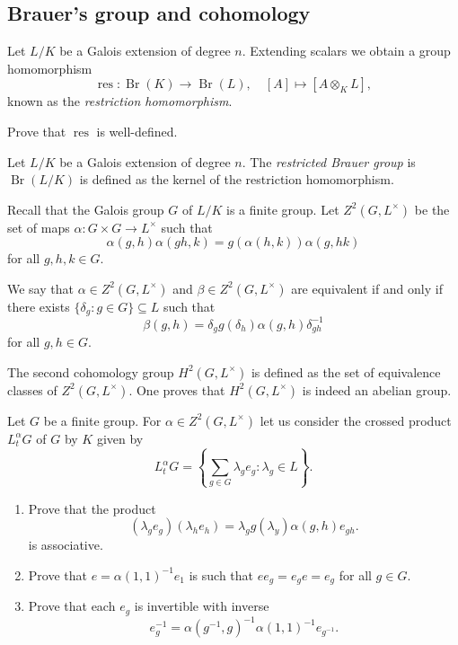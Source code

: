 \subsection{Brauer's group and cohomology}

Let $L/K$ be a Galois extension of degree $n$.  
Extending scalars we obtain a group homomorphism
\[
    \operatorname{res}\colon\operatorname{Br}(K)\to\operatorname{Br}(L),\quad
    [A]\mapsto [A\otimes_KL],
\]
known as the \emph{restriction homomorphism}. 

\begin{exercise}
    Prove that $\operatorname{res}$ is well-defined.
\end{exercise}

\begin{definition}
    Let $L/K$ be a Galois extension of degree $n$. 
    The \emph{restricted Brauer group} is $\operatorname{Br}(L/K)$ is defined
    as the kernel of the restriction homomorphism. 
\end{definition}


Recall that the Galois group $G$ of $L/K$ is a finite group. Let 
$Z^2(G,L^{\times})$ be the set of maps $\alpha\colon G\times G\to L^{\times}$
such that 
\[
\alpha(g,h)\alpha(gh,k)=g(\alpha(h,k))\alpha(g,hk)
\]
for all $g,h,k\in G$. 

We say that 
$\alpha\in Z^2(G,L^{\times})$ and $\beta\in Z^2(G,L^{\times})$ 
are equivalent if and only if
there exists $\{\delta_g:g\in G\}\subseteq L$ such that 
\[
\beta(g,h)=\delta_gg(\delta_h)\alpha(g,h)\delta^{-1}_{gh}
\]
for all $g,h\in G$. 

The second cohomology group $H^2(G,L^{\times})$ is defined as the
set of equivalence classes of $Z^2(G,L^{\times})$. One proves that
$H^2(G,L^{\times})$ is indeed an abelian group. 

\begin{exercise}
Let $G$ be a finite group. 
For $\alpha\in Z^2(G,L^{\times})$ let us consider the 
crossed product $L_t^{\alpha}G$ of $G$ by $K$ 
given by 
\[
L_t^{\alpha}G=\left\{\sum_{g\in G}\lambda_ge_g:\lambda_g\in L\right\}.
\]
\begin{enumerate}
    \item Prove that the product 
\[
    (\lambda_ge_g)(\lambda_he_h)=\lambda_gg(\lambda_y)\alpha(g,h)e_{gh}.
\]
is associative. 
\item Prove that $e=\alpha(1,1)^{-1}e_1$ is such that 
$ee_g=e_ge=e_g$ for all $g\in G$. 
\item Prove that 
each $e_g$ is invertible with inverse 
\[
e_g^{-1}=\alpha(g^{-1},g)^{-1}\alpha(1,1)^{-1}e_{g^{-1}}.
\]
\end{enumerate}
\end{exercise}

